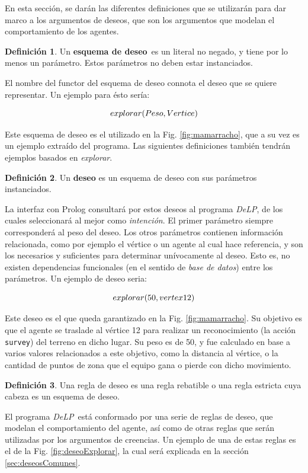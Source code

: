 \documentclass[oneside]{book}
\theoremstyle{definition}
\newtheorem{definicion}{Definición}[section]
\newcommand{\DLP}{\mbox{\textit{DeLP}}}
\newcommand{\lit}[1]{\mbox{$ #1$}}
\newcommand{\nlA}[1]{$$\mbox{#1}$$}
\begin{document}
En esta sección, se darán las diferentes definiciones que se utilizarán para dar marco a los
argumentos de deseos, que son los argumentos que modelan el comportamiento de los agentes.

\begin{definicion}
	Un \textbf{esquema de deseo}\ es un literal no negado, y tiene por lo menos 
	un parámetro. Estos parámetros no deben estar instanciados.
\end{definicion}


El nombre del functor del esquema de deseo connota el deseo que se quiere 
representar. Un ejemplo para ésto sería:

\nlA{\lit{explorar(Peso, Vertice)}}

Este esquema de deseo es el utilizado en la Fig. \ref{fig:mamarracho}, que a 
su vez es un ejemplo extraído del programa. Las siguientes definiciones también
tendrán ejemplos basados en \textit{explorar}.

\begin{definicion}
	Un \textbf{deseo} es un esquema de deseo con sus parámetros instanciados.
\end{definicion}

La interfaz con Prolog consultará por estos deseos al programa \DLP, de los 
cuales seleccionará al mejor como \emph{intención}. El primer parámetro 
siempre corresponderá al peso del deseo. Los otros parámetros contienen 
información relacionada, como por ejemplo el vértice o un agente al cual hace 
referencia, y son los necesarios y suficientes para determinar unívocamente al
deseo. Esto es, no existen dependencias funcionales (en el sentido de 
\emph{base de datos}) entre los parámetros. Un ejemplo de deseo seria:

\nlA{\lit{explorar(50, vertex12)}}

Este deseo es el que queda garantizado en la Fig. \ref{fig:mamarracho}. Su 
objetivo es que el agente se traslade al vértice 12 para 
realizar un reconocimiento (la acción \texttt{survey}) del terreno en dicho
lugar. Su peso es de 50, y fue calculado en base a varios valores relacionados
a este objetivo, como la distancia al vértice, o la cantidad de puntos de zona
que el equipo gana o pierde con dicho movimiento.


\begin{definicion}
Una {regla de deseo} es una regla rebatible o una regla estricta cuya cabeza es un esquema 
de deseo.
\end{definicion}

El programa \DLP\ está conformado por una serie de reglas de deseo, que modelan
el comportamiento del agente, así como de otras reglas que serán utilizadas por los 
argumentos de creencias. Un ejemplo de una de estas reglas es el de la Fig. 
\ref{fig:deseoExplorar}, la cual será explicada en la sección \ref{sec:deseosComunes}.
\end{document}

